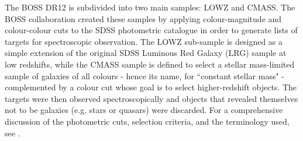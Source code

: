\qquad The BOSS DR12 is subdivided into two main samples: LOWZ and CMASS. The BOSS collaboration created these samples by applying colour-magnitude and colour-colour cuts to the SDSS photometric catalogue in order to generate lists of targets for spectroscopic observation. The LOWZ sub-sample is designed as a simple extension of the original SDSS Luminous Red Galaxy (LRG) sample \citep{2001Eisenstein} at low redshifts, while the CMASS  sample is defined to select a stellar mass-limited sample of galaxies of all colours - hence its name, for ``constant stellar mass" - complemented by a colour cut whose goal is to select higher-redshift objects. The targets were then observed spectroscopically and objects that revealed themselves not to be galaxies (e.g. stars or quasars) were discarded. For a comprehensive discussion of the photometric cuts, selection criteria, and the terminology used, see \cite{BOSS}.


